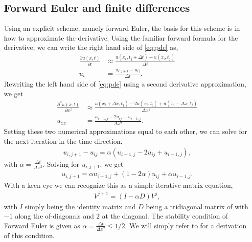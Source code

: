 \subsection{Forward Euler and finite differences}
Using an explicit scheme, namely forward Euler\citep[ch. 10.2.2]{hjorth-jensen_computational_2015}, the basis for this scheme is in how to approximate the derivative. Using the familiar forward formula for the derivative, we can write the right hand side of \eqref{eq:pde} as,
\begin{align*}
    \frac{\partial u(x,t)}{\partial t} &\approx \frac{u(x_i, t_j + \Delta t) - u(x_i, t_j)}{\Delta t} \\
    u_t &= \frac{u_{i,j+1} - u_{ij}}{\Delta t}.
\end{align*}
Rewriting the left hand side of \eqref{eq:pde} using a second derivative approximation, we get
\begin{align*}
\frac{\partial^2 u(x,t)}{\partial x^2} &\approx \frac{u(x_i+\Delta x,t_j) - 2u(x_i,t_j) + u(x_i-\Delta x, t_j)}{\Delta x^2} \\
u_{xx} &= \frac{u_{i+1,j} - 2u_{ij} + u_{i-1,j}}{\Delta x^2}.
\end{align*}
Setting these two numerical approximations equal to each other, we can solve for the next iteration in the time direction.
\begin{align*}
    u_{i,j+1} - u_{ij} = \alpha (u_{i+1,j} - 2 u_{ij} + u_{i-1,j}),
\end{align*}
with $\alpha = \frac{\Delta t}{\Delta x^2}$. Solving for $u_{i,j+1}$, we get
\begin{align}
    u_{i,j+1} = \alpha u_{i+1,j} + (1 - 2 \alpha) u_{ij} + \alpha u_{i-1,j}.
    \label{eq:explicit-forward-euler-discretized}
\end{align}
With a keen eye we can recognize this as a simple iterative matrix equation,
\begin{align}
    V^{j+1} = (I - \alpha D) V^j,
    \label{eq:fw-euler-matrix}
\end{align}
with $I$ simply being the identity matrix and $D$ being a tridiagonal matrix of with $-1$ along the of-diagonals and $2$ at the diagonal.
The stability condition of Forward Euler is given as $\alpha = \frac{\Delta t}{\Delta x^2} \leq 1/2$. We will simply refer to \citet[ch. 10.2.1]{hjorth-jensen_computational_2015} for a derivation of this condition.

